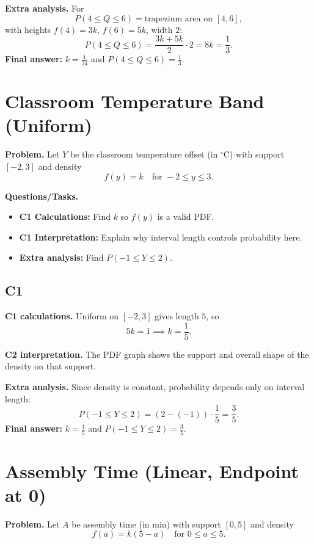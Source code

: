 \textbf{Extra analysis.}
For
\[
P(4\le Q\le6)=\text{trapezium area on }[4,6],
\]
with heights $f(4)=3k$, $f(6)=5k$, width $2$:
\[
P(4\le Q\le6)=\frac{3k+5k}{2}\cdot2=8k=\frac13.
\]
\textbf{Final answer:} $k=\frac1{24}$ and $P(4\le Q\le6)=\frac13$.
	\section{Classroom Temperature Band (Uniform)}
	
	\textbf{Problem.}
	Let $Y$ be the classroom temperature offset (in $^\circ$C) with support $[-2,3]$ and density
	\[
	f(y)=k\quad\text{for }-2\le y\le 3.
	\]
	
	\textbf{Questions/Tasks.}
	\begin{itemize}
		\item \textbf{C1 Calculations:} Find $k$ so $f(y)$ is a valid PDF.
		\item \textbf{C1 Interpretation:} Explain why interval length controls probability here.
		\item \textbf{Extra analysis:} Find $P(-1\le Y\le 2)$.
	\end{itemize}

	\subsection*{C1}

\textbf{C1 calculations.}
Uniform on $[-2,3]$ gives length $5$, so
	\[
	5k=1\implies k=\frac15.
	\]

\textbf{C2 interpretation.}
The PDF graph shows the support and overall shape of the density on that support.

\textbf{Extra analysis.}
Since density is constant, probability depends only on interval length:
\[
P(-1\le Y\le2)=(2-(-1))\cdot\frac15=\frac35.
\]
\textbf{Final answer:} $k=\frac15$ and $P(-1\le Y\le2)=\frac35$.
	\section{Assembly Time (Linear, Endpoint at 0)}
	
	\textbf{Problem.}
	Let $A$ be assembly time (in min) with support $[0,5]$ and density
	\[
	f(a)=k(5-a)\quad\text{for }0\le a\le 5.
	\]
	
